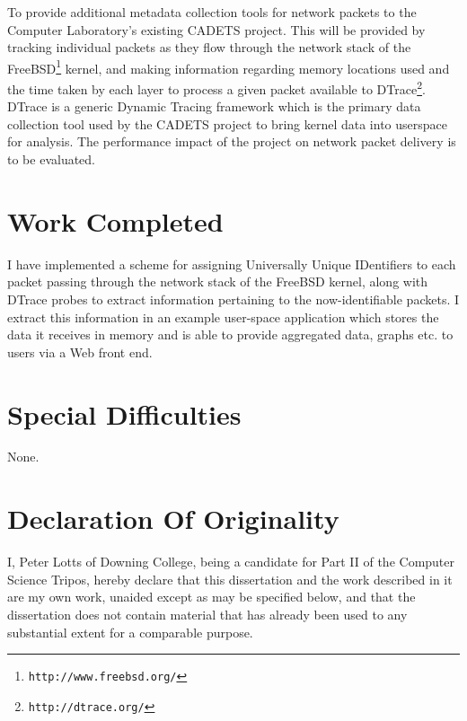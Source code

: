 \documentclass[a4paper,12pt,twoside,openright]{report}
\begin{document}
	To provide additional metadata collection tools for network packets to the Computer Laboratory's existing CADETS project. This will be provided by tracking individual packets as they flow through the network stack of the FreeBSD\footnote{\texttt{http://www.freebsd.org/}} kernel, and making information regarding memory locations used and the time taken by each layer to process a given packet available to DTrace\footnote{\texttt{http://dtrace.org/}}. DTrace is a generic Dynamic Tracing framework which is the primary data collection tool used by the CADETS project to bring kernel data into userspace for analysis. The performance impact of the project on network packet delivery is to be evaluated.
	
	
	\section*{Work Completed}
	
	I have implemented a scheme for assigning Universally Unique IDentifiers to each packet passing through the network stack of the FreeBSD kernel, along with DTrace probes to extract information pertaining to the now-identifiable packets. I extract this information in an example user-space application which stores the data it receives in memory and is able to provide aggregated data, graphs etc. to users via a Web front end.
	
	\section*{Special Difficulties}
	
	None.
	
	\newpage
	\section*{Declaration Of Originality}
	
	I, Peter Lotts of Downing College, being a candidate for Part II of
	the Computer Science Tripos, hereby declare
	that this dissertation and the work described in it are my own work,
	unaided except as may be specified below, and that the dissertation
	does not contain material that has already been used to any substantial
	extent for a comparable purpose.
	
	\bigskip
	
	\medskip
	
	\tableofcontents
	
\end{document}
